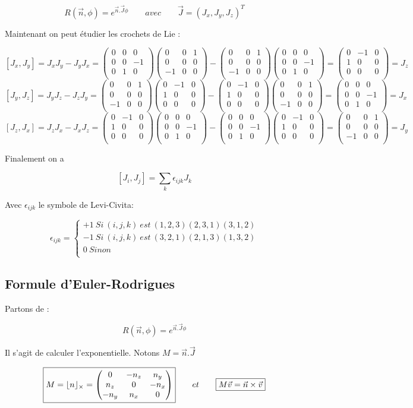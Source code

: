 \documentclass[12pt,a4paper]{article}
\DeclarePairedDelimiter\floor{\lfloor}{\rfloor}
\newcommand{\Jx}
{
\begin{pmatrix}
	0&0&0\\
	0&0&-1\\
	0&1&0\\
\end{pmatrix}
}
\newcommand{\Jy}
{
	\begin{pmatrix}
		0&0&1\\
		0&0&0\\
		-1&0&0\\
	\end{pmatrix}
}
\newcommand{\Jz}
{
	\begin{pmatrix}
		0&-1&0\\
		1&0&0\\
		0&0&0\\
	\end{pmatrix}
}
\begin{document}
	\[
		\boxed{R(\vec{n},\phi) = e^{\vec{n}.\vec{J} \phi} \quad \quad avec\quad\quad \vec{J}=(J_x,J_y,J_z)^T }
	\]
	
	Maintenant on peut étudier les crochets de Lie :
	
	\[
		[J_x,J_y]=J_xJ_y-J_yJ_x=\Jx\Jy-\Jy\Jx=\Jz=J_z
	\]
	\[
		[J_y,J_z]=J_yJ_z-J_zJ_y=\Jy\Jz-\Jz\Jy=\Jx=J_x
	\]
	\[
		[J_z,J_x]=J_zJ_x-J_xJ_z=\Jz\Jx-\Jx\Jz=\Jy=J_y
	\]
	
	Finalement on a 
	
	\[
		\boxed{[J_i,J_j]=\sum_k \epsilon_{ijk}J_k}
	\]
	
	Avec $\epsilon_{ijk}$ le symbole de Levi-Civita:
	
	\[
		\epsilon_{ijk}=\left\{
		\begin{array}{l}
		+1\ Si\ (i,j,k)\ est \ (1,2,3)(2,3,1)(3,1,2)\\
		-1\ Si\ (i,j,k)\ est \ (3,2,1)(2,1,3)(1,3,2)\\
		0\ Sinon\\
		\end{array}
		\right.
	\]
	
	\subsection{Formule d'Euler-Rodrigues}
	Partons de :
	
	\[
		R(\vec{n},\phi) = e^{\vec{n}.\vec{J} \phi}
	\]
	
	Il s'agit de calculer l'exponentielle. Notons $M=\vec{n}.\vec{J}$
	
	\[
		\boxed{M=\floor{n}_{\times}=\begin{pmatrix}
			0&-n_z&n_y\\
			n_z&0&-n_x\\
			-n_y&n_x&0\\
			\end{pmatrix}}
		\quad\quad et \quad\quad \boxed{M\vec{v}=\vec{n} \times \vec{v}}
	\]
	
\end{document}
